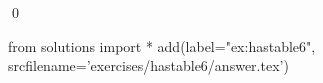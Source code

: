 
\begin{ex} 
  \label{ex:hastable6}
  
  \qed
\end{ex} 
\begin{python0}
from solutions import *
add(label="ex:hastable6",
    srcfilename='exercises/hastable6/answer.tex') 
\end{python0}
